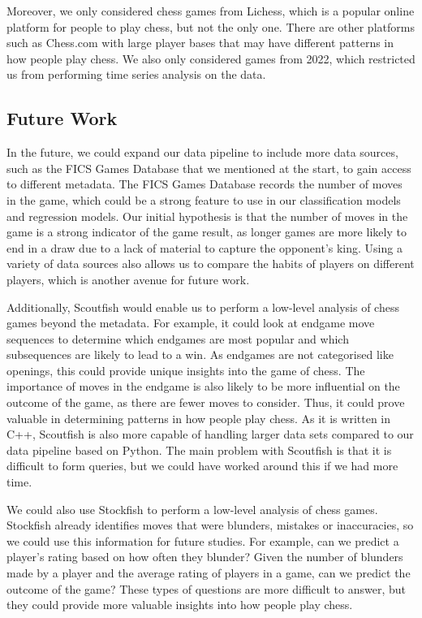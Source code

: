 \documentclass[a4paper, 11pt]{article}
\begin{document}
Moreover, we only considered chess games from Lichess, which is a popular online platform for people to play chess, but not the only one. There are other platforms such as Chess.com with large player bases that may have different patterns in how people play chess. We also only considered games from 2022, which restricted us from performing time series analysis on the data.

\subsection{Future Work}
In the future, we could expand our data pipeline to include more data sources, such as the FICS Games Database that we mentioned at the start, to gain access to different metadata. The FICS Games Database records the number of moves in the game, which could be a strong feature to use in our classification models and regression models. Our initial hypothesis is that the number of moves in the game is a strong indicator of the game result, as longer games are more likely to end in a draw due to a lack of material to capture the opponent's king. Using a variety of data sources also allows us to compare the habits of players on different players, which is another avenue for future work.

Additionally, Scoutfish would enable us to perform a low-level analysis of chess games beyond the metadata. For example, it could look at endgame move sequences to determine which endgames are most popular and which subsequences are likely to lead to a win. As endgames are not categorised like openings, this could provide unique insights into the game of chess. The importance of moves in the endgame is also likely to be more influential on the outcome of the game, as there are fewer moves to consider. Thus, it could prove valuable in determining patterns in how people play chess. As it is written in C++, Scoutfish is also more capable of handling larger data sets compared to our data pipeline based on Python. The main problem with Scoutfish is that it is difficult to form queries, but we could have worked around this if we had more time.

We could also use Stockfish to perform a low-level analysis of chess games. Stockfish already identifies moves that were blunders, mistakes or inaccuracies, so we could use this information for future studies. For example, can we predict a player's rating based on how often they blunder? Given the number of blunders made by a player and the average rating of players in a game, can we predict the outcome of the game? These types of questions are more difficult to answer, but they could provide more valuable insights into how people play chess.
\end{document}
